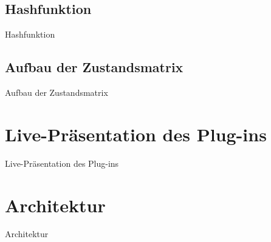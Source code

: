 \documentclass{beamer}
\begin{document}
\subsection{Hashfunktion}
\begin{frame}{Hashfunktion}
\end{frame}

\subsection{Aufbau der Zustandsmatrix}
\begin{frame}{Aufbau der Zustandsmatrix}
\end{frame}

\section{Live-Präsentation des Plug-ins}
\begin{frame}{Live-Präsentation des Plug-ins}
\end{frame}

\section{Architektur}
\begin{frame}{Architektur}
\end{frame}
\end{document}
